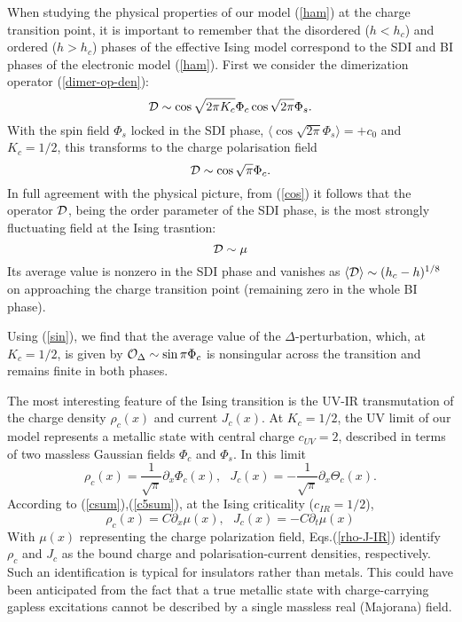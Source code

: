 When studying the physical properties of our model (\ref{ham}) at the charge
transition point, it is important to remember that the disordered ($h < h_c$)
and ordered ($h > h_c$) phases of the effective Ising model
correspond to the SDI and BI phases of the electronic model (\ref{ham}).
First we consider the dimerization operator (\ref{dimer-op-den}):
$$
{\cal{D}} \sim \cos \sqrt{2\pi K_c} \Phi_c \cos \sqrt{2\pi} \Phi_s.
$$
With the spin field $\Phi_s$ locked in the SDI phase,
$\langle \cos \sqrt{2\pi} \Phi_s \rangle = +c_0$ and $K_c =1/2$, this transforms to
the charge polarisation field
$$
{\cal{D}} \sim \cos \sqrt{\pi} \Phi_c.
$$
In full agreement with the physical picture, from (\ref{cos}) it follows that
the operator ${\cal{D}}$, being the
order parameter of the SDI phase, is the most strongly fluctuating field
at the Ising trasntion:
\begin{equation}
{\cal{D}} \sim \mu \label{D-mu}
\end{equation}
Its average value is nonzero in the SDI phase and vanishes
as $\langle {\cal{D}} \rangle \sim (h_c - h)^{1/8}$ on approaching the charge transition
point (remaining zero in the whole BI phase).

Using (\ref{sin}), we find that
the average value of the $\Delta$-perturbation, which, at $K_c = 1/2$, is
given by
$
{\cal{O}}_{\Delta} \sim \sin{\pi} \Phi_c
$
is nonsingular across the transition and remains finite in both
phases.

The most interesting feature of the Ising transition
is the UV-IR transmutation of the charge density $\rho_c (x)$
and current $J_c (x)$. At $K_c = 1/2$, the UV limit of our model
represents a metallic state with central charge $c_{UV} = 2$,
described in terms of two massless Gaussian fields $\Phi_c$ and $\Phi_s$.
In this limit
$$
\rho_c (x) = \frac{1}{\sqrt{\pi}} \partial_x \Phi_c (x), ~~~
J_c (x) = - \frac{1}{\sqrt{\pi}} \partial_x \Theta_c (x).
$$
According to (\ref{csum}),(\ref{c5sum}), at the Ising criticality
($c_{IR} = 1/2$),
\begin{equation}
\rho_c (x) = C \partial_x \mu (x), ~~~J_c (x) = - C \partial_t \mu (x)
\label{rho-J-IR}
\end{equation}
With $\mu (x)$ representing the charge polarization field,
Eqs.(\ref{rho-J-IR}) identify $\rho_c$ and $J_c$ as the bound charge
and polarisation-current densities,
respectively. Such an identification is typical
for insulators rather than metals.
This could have been anticipated from the fact that a true metallic state
with charge-carrying gapless excitations cannot be described by a single
massless real (Majorana) field.

